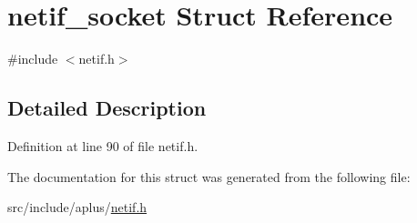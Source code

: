 \hypertarget{structnetif__socket}{\section{netif\+\_\+socket Struct Reference}
\label{structnetif__socket}
}


{\ttfamily \#include $<$netif.\+h$>$}



\subsection{Detailed Description}


Definition at line 90 of file netif.\+h.



The documentation for this struct was generated from the following file\+:\begin{DoxyCompactItemize}
\item 
src/include/aplus/\hyperlink{netif_8h}{netif.\+h}\end{DoxyCompactItemize}
